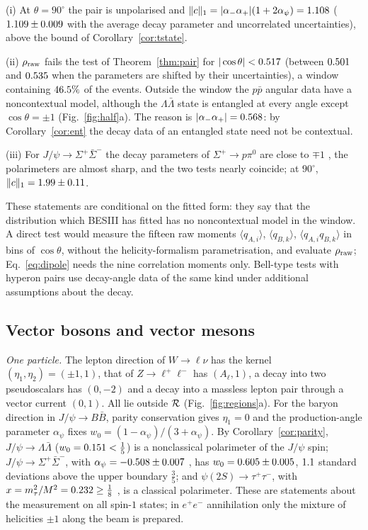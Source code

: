 (i) At $\theta=90^\circ$ the pair is unpolarised and $\|c\|_1=|\alpha_-\alpha_+|(1+2\alpha_\psi)=1.108$ ($1.109\pm0.009$ with the average decay parameter and uncorrelated uncertainties), above the bound of Corollary~\ref{cor:tstate}.

(ii) $\rho_{\mathrm{raw}}$ fails the test of Theorem~\ref{thm:pair} for $|\cos\theta|<0.517$ (between $0.501$ and $0.535$ when the parameters are shifted by their uncertainties), a window containing $46.5\%$ of the events. Outside the window the $p\bar p$ angular data have a noncontextual model, although the $\Lambda\bar\Lambda$ state is entangled at every angle except $\cos\theta=\pm1$ (Fig.~\ref{fig:half}a). The reason is $|\alpha_-\alpha_+|=0.568$: by Corollary~\ref{cor:ent} the decay data of an entangled state need not be contextual.

(iii) For $J/\psi\to\Sigma^+\bar\Sigma^-$ the decay parameters of $\Sigma^+\to p\pi^0$ are close to $\mp1$ \cite{besiii2020sigma}, the polarimeters are almost sharp, and the two tests nearly coincide; at $90^\circ$, $\|c\|_1=1.99\pm0.11$.

These statements are conditional on the fitted form: they say that the distribution which BESIII has fitted has no noncontextual model in the window. A direct test would measure the fifteen raw moments $\langle q_{A,i}\rangle$, $\langle q_{B,k}\rangle$, $\langle q_{A,i}q_{B,k}\rangle$ in bins of $\cos\theta$, without the helicity-formalism parametrisation, and evaluate $\rho_{\mathrm{raw}}$; Eq.~\eqref{eq:dipole} needs the nine correlation moments only. Bell-type tests with hyperon pairs \cite{tornqvist1981,besiii2025} use decay-angle data of the same kind under additional assumptions about the decay.

\subsection{Vector bosons and vector mesons}

\emph{One particle.} The lepton direction of $W\to\ell\nu$ has the kernel $(\eta_1,\eta_2)=(\pm1,1)$, that of $Z\to\ell^+\ell^-$ has $(A_\ell,1)$, a decay into two pseudoscalars has $(0,-2)$ and a decay into a massless lepton pair through a vector current $(0,1)$. All lie outside $\mathcal{R}$ (Fig.~\ref{fig:regions}a). For the baryon direction in $J/\psi\to B\bar B$, parity conservation gives $\eta_1=0$ and the production-angle parameter $\alpha_\psi$ fixes $w_0=(1-\alpha_\psi)/(3+\alpha_\psi)$. By Corollary~\ref{cor:parity}, $J/\psi\to\Lambda\bar\Lambda$ ($w_0=0.151<\tfrac15$) is a nonclassical polarimeter of the $J/\psi$ spin; $J/\psi\to\Sigma^+\bar\Sigma^-$, with $\alpha_\psi=-0.508\pm0.007$ \cite{besiii2020sigma}, has $w_0=0.605\pm0.005$, $1.1$ standard deviations above the upper boundary $\tfrac35$; and $\psi(2S)\to\tau^+\tau^-$, with $x=m_\tau^2/M^2=0.232\ge\tfrac18$ \cite{pdg2024}, is a classical polarimeter. These are statements about the measurement on all spin-$1$ states; in $e^+e^-$ annihilation only the mixture of helicities $\pm1$ along the beam is prepared.

